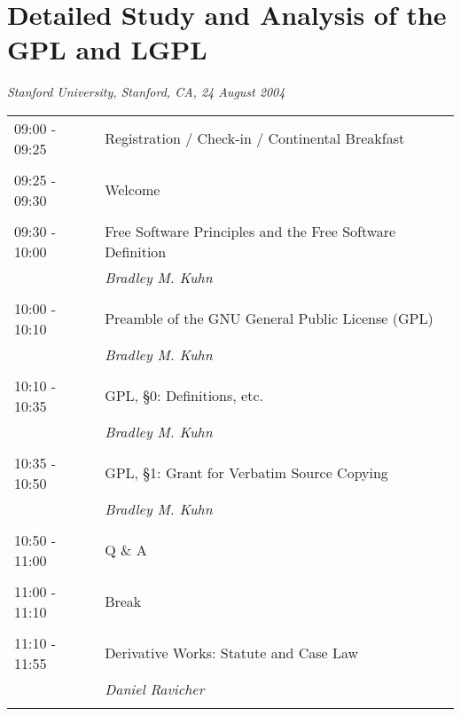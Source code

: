 \documentclass[11pt, letterpaper]{book}
\begin{document}

\chapter*{Detailed Study and Analysis of the GPL and LGPL}

\textit{Stanford University, Stanford, CA, 24 August 2004}

\begin{tabular}[t]{ll}
09:00 - 09:25 & Registration / Check-in / Continental Breakfast\\
&\\
09:25 - 09:30 & Welcome\\
&\\
09:30 - 10:00 & Free Software Principles and the Free Software Definition\\
& \textit{Bradley M. Kuhn}\\
&\\
10:00 - 10:10 & Preamble of the GNU General Public License (GPL)\\
& \textit{Bradley M. Kuhn}\\
&\\
10:10 - 10:35 & GPL, \S 0: Definitions, etc.\\
& \textit{Bradley M. Kuhn}\\
&\\
10:35 - 10:50 & GPL, \S 1: Grant for Verbatim Source Copying\\
& \textit{Bradley M. Kuhn}\\
&\\
10:50 - 11:00 & Q \& A\\
&\\
11:00 - 11:10 & Break\\
&\\
11:10 - 11:55 & Derivative Works: Statute and Case Law\\
& \textit{Daniel Ravicher}\\
&\\
\end{tabular}
\end{document}
